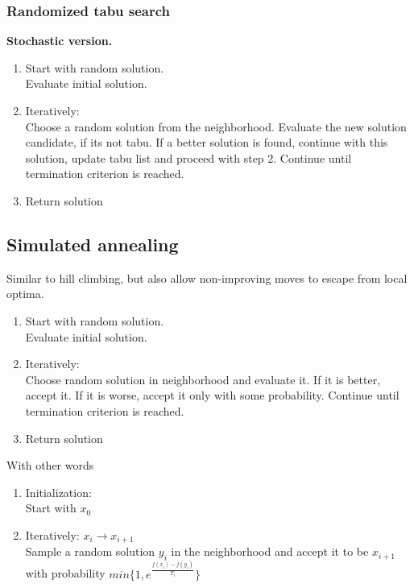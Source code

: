 \subsubsection{Randomized tabu search}
\textbf{Stochastic version.}

\begin{enumerate}
    \item Start with random solution. \\
        Evaluate initial solution.
    \item Iteratively: \\
Choose a random solution from the neighborhood.
Evaluate the new solution candidate, if its not tabu.
If a better solution is found, continue with this solution,
update tabu list and proceed with step 2. Continue until
termination criterion is reached.
    \item Return solution
\end{enumerate}

\subsection{Simulated annealing}
Similar to hill climbing, but also allow non-improving
moves to escape from local optima.

\begin{enumerate}
    \item Start with random solution. \\
        Evaluate initial solution.
    \item Iteratively: \\
Choose random solution in neighborhood and evaluate it. If
it is better, accept it. If it is worse, accept it only with some
probability.
Continue until termination criterion is reached.
    \item Return solution
\end{enumerate}

With other words

\begin{enumerate}
    \item Initialization: \\
    Start with $x_0$
    \item Iteratively: $x_i \rightarrow x_{i+1}$ \\
    Sample a random solution $y_i$ in the neighborhood and accept it to be $x_{i+1}$ with probability $min\{ 1, e^{\frac{f(x_i)-f(y_i)}{T_i}}\}$
\end{enumerate}

